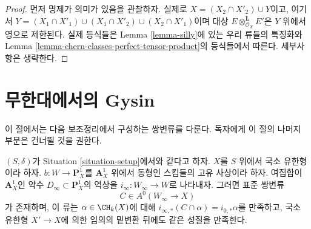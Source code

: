 \begin{proof}
먼저 명제가 의미가 있음을 관찰하자. 실제로
$X = (X_2 \cap X'_2) \cup Y$이고, 여기서
$Y = (X_1 \cap X'_1) \cup (X_1 \cap X'_2) \cup (X_2 \cap X'_1)$이며
대상 $E \otimes_{\mathcal{O}_X}^\mathbf{L} E'$은 $Y$ 위에서 영으로
제한된다. 실제 등식들은 Lemma \ref{lemma-silly}에 있는 우리 류들의
특징화와 Lemma \ref{lemma-chern-classes-perfect-tensor-product}의 등식들에서
따른다. 세부사항은 생략한다.
\end{proof}







\section{무한대에서의 Gysin}
\label{section-gysin-at-infty}

\noindent
이 절에서는 다음 보조정리에서 구성하는 쌍변류를 다룬다. 독자에게 이
절의 나머지 부분은 건너뛸 것을 권한다.

\begin{lemma}
\label{lemma-gysin-at-infty}
$(S, \delta)$가 Situation \ref{situation-setup}에서와 같다고 하자.
$X$를 $S$ 위에서 국소 유한형이라 하자.
$b : W \to \mathbf{P}^1_X$를 $\mathbf{A}^1_X$ 위에서 동형인 스킴들의
고유 사상이라 하자. 여집합이 $\mathbf{A}^1_X$인 약수
$D_\infty \subset \mathbf{P}^1_X$의 역상을
$i_\infty : W_\infty \to W$로 나타내자. 그러면 표준 쌍변류
$$
C \in A^0(W_\infty \to X)
$$
가 존재하며, 이 류는 $\alpha \in \CH_k(X)$에 대해
$i_{\infty, *}(C \cap \alpha) = i_{0, *}\alpha$를 만족하고, 국소 유한형
$X' \to X$에 의한 임의의 밑변환 뒤에도 같은 성질을 만족한다.
\end{lemma}


